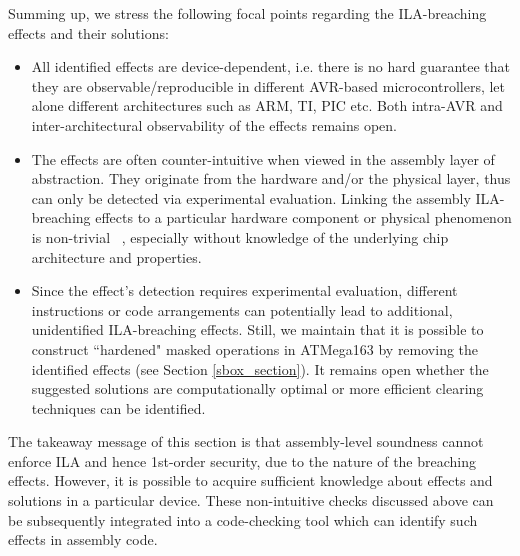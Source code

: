 Summing up, we stress the following focal points regarding the ILA-breaching effects and their solutions:
\begin{itemize}
\item All identified effects are device-dependent, i.e. there is no hard guarantee that they are observable/reproducible in different AVR-based microcontrollers, let alone different architectures such as ARM, TI, PIC etc. Both intra-AVR and inter-architectural observability of the effects remains open.
\item The effects are often counter-intuitive when viewed in the assembly layer of abstraction. They originate from the hardware and/or the physical layer, thus can only be detected via experimental evaluation. Linking the assembly ILA-breaching effects to a particular hardware component or physical phenomenon is non-trivial ~\cite{renauld,others}, especially without knowledge of the underlying chip architecture and properties.
\item  Since the effect's detection requires experimental evaluation, different instructions or code arrangements can potentially lead to additional, unidentified ILA-breaching effects. Still, we maintain that it is possible to construct ``hardened" masked operations in ATMega163 by removing the identified effects (see Section \ref{sbox_section}). It remains open whether the suggested solutions are computationally optimal or more efficient clearing techniques can be identified.
\end{itemize}
The takeaway message of this section is that assembly-level soundness cannot enforce ILA and hence 1st-order security, due to the nature of the breaching effects. However, it is possible to acquire sufficient knowledge about effects and solutions in a particular device. These non-intuitive checks discussed above can be subsequently integrated into a code-checking tool which can identify such effects in assembly code.
